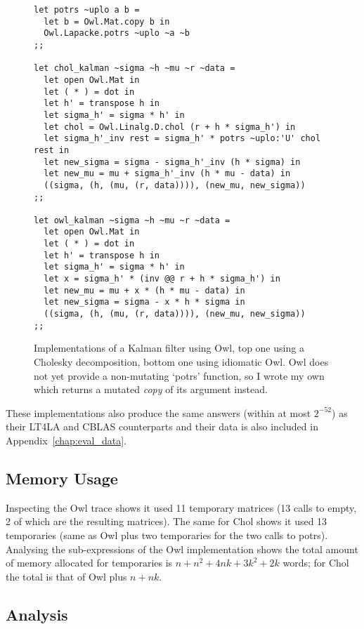 \begin{figure}[tp]
    \centering
    \begin{verbatim}
let potrs ~uplo a b =
  let b = Owl.Mat.copy b in
  Owl.Lapacke.potrs ~uplo ~a ~b
;;

let chol_kalman ~sigma ~h ~mu ~r ~data =
  let open Owl.Mat in
  let ( * ) = dot in
  let h' = transpose h in
  let sigma_h' = sigma * h' in
  let chol = Owl.Linalg.D.chol (r + h * sigma_h') in
  let sigma_h'_inv rest = sigma_h' * potrs ~uplo:'U' chol rest in
  let new_sigma = sigma - sigma_h'_inv (h * sigma) in
  let new_mu = mu + sigma_h'_inv (h * mu - data) in
  ((sigma, (h, (mu, (r, data)))), (new_mu, new_sigma))
;;

let owl_kalman ~sigma ~h ~mu ~r ~data =
  let open Owl.Mat in
  let ( * ) = dot in
  let h' = transpose h in
  let sigma_h' = sigma * h' in
  let x = sigma_h' * (inv @@ r + h * sigma_h') in
  let new_mu = mu + x * (h * mu - data) in
  let new_sigma = sigma - x * h * sigma in
  ((sigma, (h, (mu, (r, data)))), (new_mu, new_sigma))
;;
    \end{verbatim}
    \caption{Implementations of a Kalman filter using Owl, top one using a
        Cholesky decomposition, bottom one using idiomatic Owl. Owl does not
        yet provide a non-mutating `potrs' function, so I wrote my own which
        returns a mutated \emph{copy} of its argument
        instead.}\label{fig:chol_owl_kalman}

\end{figure}

These implementations also produce the same answers (within at most $2^{-52}$)
as their LT4LA and CBLAS counterparts and their data is also included in
Appendix~\ref{chap:eval_data}.

\subsection{Memory Usage}

Inspecting the Owl trace shows it used 11 temporary matrices (13 calls to
empty, 2 of which are the resulting matrices). The same for Chol shows it used
13 temporaries (same as Owl plus two temporaries for the two calls to potrs).
Analysing the sub-expressions of the Owl implementation shows the total amount
of memory allocated for temporaries is $n + n^2 + 4nk + 3k^2 + 2k$ words; for
Chol the total is that of Owl plus $n + nk$.

\subsection{Analysis}

